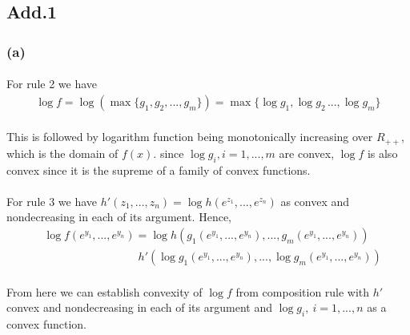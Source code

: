 \subsection*{Add.1}
\subsubsection*{(a)}
\paragraph{}
For rule 2 we have
\begin{align*}
\log f =\log (\max\{g_1, g_2,...,g_m\}) = \max\{\log g_1, \log g_2\,...,\log g_m\}
\end{align*}
\paragraph{}
This is followed by logarithm function being monotonically increasing over $R_{++}$, which is the domain of $f(x)$. since $\log g_i, i=1,...,m$ are convex, $\log f$ is also convex since it is the supreme of a family of convex functions.
\paragraph{}
For rule 3 we have $h'(z_1,...,z_n) = \log h(e^{z_1},...,e^{z_n})$ as convex and nondecreasing in each of its argument. Hence, 
\begin{align*}
&\log f(e^{y_1},...,e^{y_n})  = \log h(g_1(e^{y_1},...,e^{y_n}),...,g_m(e^{y_1},...,e^{y_n})) \\
& \qquad \qquad \qquad \qquad  \ \ h'(\log g_1(e^{y_1},...,e^{y_n}),...,\log g_m(e^{y_1},...,e^{y_n}))
\end{align*}
\paragraph{}
From here we can establish convexity of $\log f$ from composition rule with $h'$ convex and nondecreasing in each of its argument and $\log g_i,\ i=1,...,n$ as a convex function.
